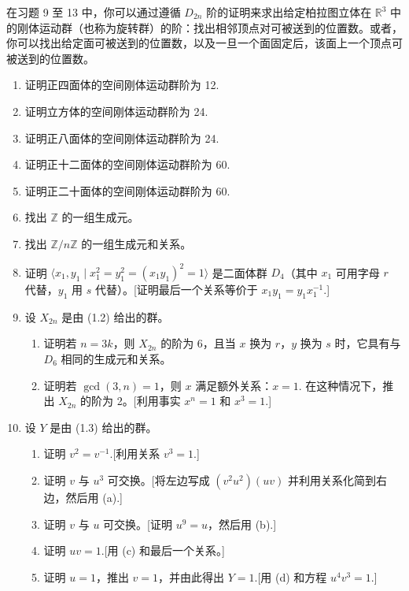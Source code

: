 在习题 9 至 13 中，你可以通过遵循 \( D_{2n} \) 阶的证明来求出给定柏拉图立体在 \( \mathbb{R}^3 \) 中的刚体运动群（也称为旋转群）的阶：找出相邻顶点对可被送到的位置数。或者，你可以找出给定面可被送到的位置数，以及一旦一个面固定后，该面上一个顶点可被送到的位置数。
\begin{enumerate}[resume*]
\item 证明正四面体的空间刚体运动群阶为 12.
\item 证明立方体的空间刚体运动群阶为 24.
\item 证明正八面体的空间刚体运动群阶为 24.
\item 证明正十二面体的空间刚体运动群阶为 60.
\item 证明正二十面体的空间刚体运动群阶为 60.
\item 找出 \(\mathbb{Z}\) 的一组生成元。
\item 找出 \(\mathbb{Z}/n\mathbb{Z}\) 的一组生成元和关系。
\item 证明 \( \langle x_1, y_1 \mid x_1^2 = y_1^2 = (x_1y_1)^2 = 1 \rangle \) 是二面体群 \( D_4 \)（其中 \( x_1 \) 可用字母 \( r \) 代替，\( y_1 \) 用 \( s \) 代替）。[证明最后一个关系等价于 \( x_1y_1 = y_1x_1^{-1} \).]
\item 设 \( X_{2n} \) 是由 (1.2) 给出的群。
\begin{enumerate}[label=(\alph*)]
\item 证明若 \( n = 3k \)，则 \( X_{2n} \) 的阶为 6，且当 \( x \) 换为 \( r \)，\( y \) 换为 \( s \) 时，它具有与 \( D_6 \) 相同的生成元和关系。
\item 证明若 \( \gcd(3, n) = 1 \)，则 \( x \) 满足额外关系：\( x = 1 \). 在这种情况下，推出 \( X_{2n} \) 的阶为 2。[利用事实 \( x^n = 1 \) 和 \( x^3 = 1 \).]
\end{enumerate}
\item 设 \( Y \) 是由 (1.3) 给出的群。
\begin{enumerate}[label=(\alph*)]
\item 证明 \( v^2 = v^{-1} \).[利用关系 \( v^3 = 1 \).]
\item 证明 \( v \) 与 \( u^3 \) 可交换。[将左边写成 \( (v^2u^2)(uv) \) 并利用关系化简到右边，然后用 (a).]
\item 证明 \( v \) 与 \( u \) 可交换。[证明 \( u^9 = u \)，然后用 (b).]
\item 证明 \( uv = 1 \).[用 (c) 和最后一个关系。]
\item 证明 \( u = 1 \)，推出 \( v = 1 \)，并由此得出 \( Y = 1 \).[用 (d) 和方程 \( u^4v^3 = 1 \).]
\end{enumerate}
\end{enumerate}


